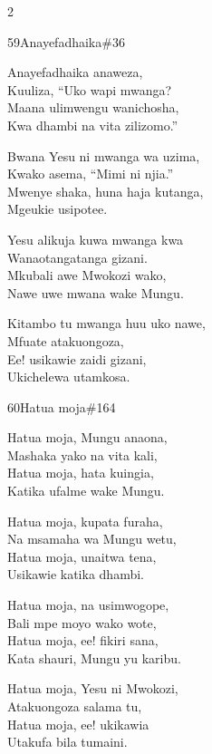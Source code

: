\documentclass{article}
\begin{document}
\begin{multicols}{2}
\begin{hymn}{59}{Anayefadhaika}{\#36}
\begin{stanza}
Anayefadhaika anaweza,\\
Kuuliza, ``Uko wapi mwanga?\\
Maana ulimwengu wanichosha,\\
Kwa dhambi na vita zilizomo.''
\end{stanza}
\begin{stanza}
Bwana Yesu ni mwanga wa uzima,\\
Kwako asema, ``Mimi ni njia.''\\
Mwenye shaka, huna haja kutanga,\\
Mgeukie usipotee.
\end{stanza}
\begin{stanza}
Yesu alikuja kuwa mwanga kwa\\
Wanaotangatanga gizani.\\
Mkubali awe Mwokozi wako,\\
Nawe uwe mwana wake Mungu.
\end{stanza}
\begin{stanza}
Kitambo tu mwanga huu uko nawe,\\
Mfuate atakuongoza,\\
Ee! usikawie zaidi gizani,\\
Ukichelewa utamkosa.
\end{stanza}
\end{hymn}

\begin{hymn}{60}{Hatua moja}{\#164}
\begin{stanza}
Hatua moja, Mungu anaona,\\
Mashaka yako na vita kali,\\
Hatua moja, hata kuingia,\\
Katika ufalme wake Mungu.
\end{stanza}
\begin{stanza}
Hatua moja, kupata furaha,\\
Na msamaha wa Mungu wetu,\\
Hatua moja, unaitwa tena,\\
Usikawie katika dhambi.
\end{stanza}
\begin{stanza}
Hatua moja, na usimwogope,\\
Bali mpe moyo wako wote,\\
Hatua moja, ee! fikiri sana,\\
Kata shauri, Mungu yu karibu.
\end{stanza}
\begin{stanza}
Hatua moja, Yesu ni Mwokozi,\\
Atakuongoza salama tu,\\
Hatua moja, ee! ukikawia\\
Utakufa bila tumaini.
\end{stanza}
\end{hymn}


\end{multicols}
\end{document}
